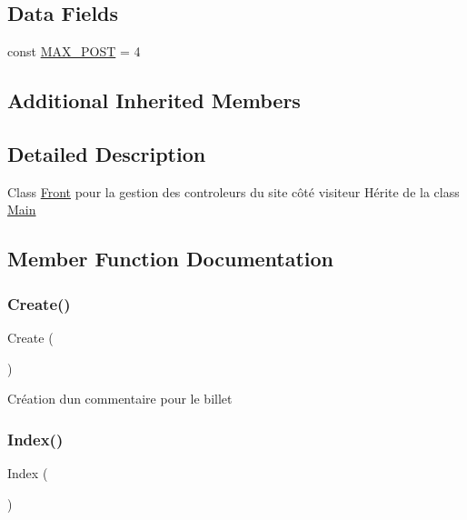 \subsection*{Data Fields}
\begin{DoxyCompactItemize}
\item 
const \hyperlink{class_src_1_1_controllers_1_1_front_ae6f0a6c86ad9f61cbc99ad3c4180b481}{M\+A\+X\+\_\+\+P\+O\+ST} = 4
\end{DoxyCompactItemize}
\subsection*{Additional Inherited Members}


\subsection{Detailed Description}
Class \hyperlink{class_src_1_1_controllers_1_1_front}{Front} pour la gestion des controleurs du site côté visiteur Hérite de la class \hyperlink{class_src_1_1_controllers_1_1_main}{Main} 

\subsection{Member Function Documentation}
\mbox{\label{class_src_1_1_controllers_1_1_front_ad01f71fa0ecc039494e3c282864298c3}} 
\subsubsection{\texorpdfstring{Create()}{Create()}}
{\footnotesize\ttfamily Create (\begin{DoxyParamCaption}{ }\end{DoxyParamCaption})}

Création d\textquotesingle{}un commentaire pour le billet \mbox{\label{class_src_1_1_controllers_1_1_front_ac36db983080e1b0934908febca5de2d9}} 
\subsubsection{\texorpdfstring{Index()}{Index()}}
{\footnotesize\ttfamily Index (\begin{DoxyParamCaption}{ }\end{DoxyParamCaption})}

